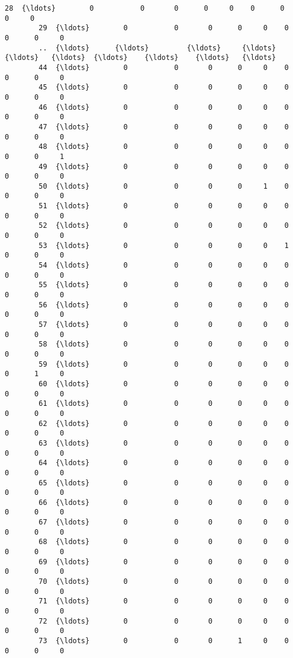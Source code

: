 \documentclass[11pt]{article}
\begin{document}
\begin{Verbatim}[commandchars=\\\{\}]
        28  {\ldots}        0           0       0      0     0    0      0      0     0   
        29  {\ldots}        0           0       0      0     0    0      0      0     0   
        ..  {\ldots}      {\ldots}         {\ldots}     {\ldots}    {\ldots}   {\ldots}  {\ldots}    {\ldots}    {\ldots}   {\ldots}   
        44  {\ldots}        0           0       0      0     0    0      0      0     0   
        45  {\ldots}        0           0       0      0     0    0      0      0     0   
        46  {\ldots}        0           0       0      0     0    0      0      0     0   
        47  {\ldots}        0           0       0      0     0    0      0      0     0   
        48  {\ldots}        0           0       0      0     0    0      0      0     1   
        49  {\ldots}        0           0       0      0     0    0      0      0     0   
        50  {\ldots}        0           0       0      0     1    0      0      0     0   
        51  {\ldots}        0           0       0      0     0    0      0      0     0   
        52  {\ldots}        0           0       0      0     0    0      0      0     0   
        53  {\ldots}        0           0       0      0     0    1      0      0     0   
        54  {\ldots}        0           0       0      0     0    0      0      0     0   
        55  {\ldots}        0           0       0      0     0    0      0      0     0   
        56  {\ldots}        0           0       0      0     0    0      0      0     0   
        57  {\ldots}        0           0       0      0     0    0      0      0     0   
        58  {\ldots}        0           0       0      0     0    0      0      0     0   
        59  {\ldots}        0           0       0      0     0    0      0      1     0   
        60  {\ldots}        0           0       0      0     0    0      0      0     0   
        61  {\ldots}        0           0       0      0     0    0      0      0     0   
        62  {\ldots}        0           0       0      0     0    0      0      0     0   
        63  {\ldots}        0           0       0      0     0    0      0      0     0   
        64  {\ldots}        0           0       0      0     0    0      0      0     0   
        65  {\ldots}        0           0       0      0     0    0      0      0     0   
        66  {\ldots}        0           0       0      0     0    0      0      0     0   
        67  {\ldots}        0           0       0      0     0    0      0      0     0   
        68  {\ldots}        0           0       0      0     0    0      0      0     0   
        69  {\ldots}        0           0       0      0     0    0      0      0     0   
        70  {\ldots}        0           0       0      0     0    0      0      0     0   
        71  {\ldots}        0           0       0      0     0    0      0      0     0   
        72  {\ldots}        0           0       0      0     0    0      0      0     0   
        73  {\ldots}        0           0       0      1     0    0      0      0     0   
        

\end{Verbatim}
\end{document}
